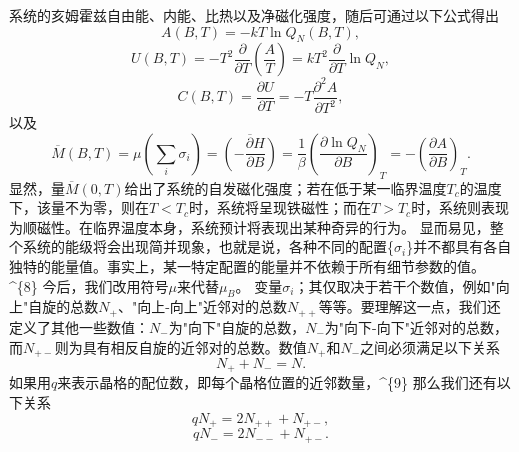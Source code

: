系统的亥姆霍兹自由能、内能、比热以及净磁化强度，随后可通过以下公式得出
\begin{equation}\tag{12.3.9}\label{eq:12.3.9}
A ( B , T ) = - k T \ln Q _ { N } ( B , T ) ,
\end{equation}
\begin{equation}\tag{12.3.10}\label{eq:12.3.10}
U ( B , T ) = - T ^{2} \frac { \partial } { \partial T } \left( \frac { A } { T } \right) = k T ^{2} \frac { \partial } { \partial T } \ln Q _ { N } ,
\end{equation}
\begin{equation}\tag{12.3.11}\label{eq:12.3.11}
C ( B , T ) = \frac { \partial U } { \partial T } = - T \frac { \partial ^{2} A } { \partial T ^{2} } ,
\end{equation}
以及
\begin{equation}\tag{12.3.12}\label{eq:12.3.12}
\overline { { { M } } } ( B , T ) = \mu \left( \sum _ { i } \sigma _ { i } \right) = \overline { { { \left( - \frac { \partial H } { \partial B } \right) } } } = \frac { 1 } { \beta } \left( \frac { \partial \ln Q _ { N } } { \partial B } \right) _ { T } = - \left( \frac { \partial A } { \partial B } \right) _ { T } .
\end{equation}
显然，量\(\overline{M}(0,T)\)给出了系统的自发磁化强度；若在低于某一临界温度\(T_{c}\)的温度下，该量不为零，则在\(T<T_{c}\)时，系统将呈现铁磁性；而在\(T>T_{c}\)时，系统则表现为顺磁性。在临界温度本身，系统预计将表现出某种奇异的行为。
显而易见，整个系统的能级将会出现简并现象，也就是说，各种不同的配置\{\(\sigma_{i}\)\}并不都具有各自独特的能量值。事实上，某一特定配置的能量并不依赖于所有细节参数的值。
\^{}\{8\} 今后，我们改用符号\(\mu\)来代替\(\mu_{B}\)。
变量\(\sigma_{i}\)；其仅取决于若干个数值，例如"向上"自旋的总数\(N_{+}\)、"向上-向上"近邻对的总数\(N_{++}\)等等。要理解这一点，我们还定义了其他一些数值：\(N_{-}\)为"向下"自旋的总数，\(N_{-}\)为"向下-向下"近邻对的总数，而\(N_{+-}\)则为具有相反自旋的近邻对的总数。数值\(N_{+}\)和\(N_{-}\)之间必须满足以下关系
\begin{equation}\tag{12.3.13}\label{eq:12.3.13}
N _ { + } + N _ { - } = N .
\end{equation}
如果用\(q\)来表示晶格的配位数，即每个晶格位置的近邻数量，\^{}\{9\} 那么我们还有以下关系
\begin{equation}\tag{12.3.14}\label{eq:12.3.14}
q N _ { + } = 2 N _ { + + } + N _ { + - } ,
\end{equation}
\begin{equation}\tag{12.3.15}\label{eq:12.3.15}
q N _ { - } = 2 N _ { -- } + N _ { + - } .
\end{equation}
